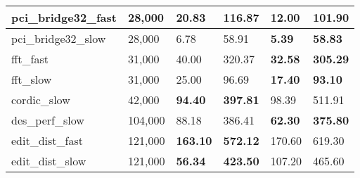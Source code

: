 \begin{table*}[!ht]
\begin{tabular}{|l|l|l|l|l|l|}
pci\_bridge32\_fast        & 28,000                 & 20.83                                                        & 116.87                                                         & \textbf{12.00}                                               & \textbf{101.90}                                                 \\ \hline
pci\_bridge32\_slow        & 28,000                 & 6.78                                                         & 58.91                                                          & \textbf{5.39}                                                & \textbf{58.83}                                                  \\ \hline
fft\_fast                  & 31,000                 & 40.00                                                        & 320.37                                                         & \textbf{32.58}                                               & \textbf{305.29}                                                 \\ \hline
fft\_slow                  & 31,000                 & 25.00                                                        & 96.69                                                          & \textbf{17.40}                                               & \textbf{93.10}                                                  \\ \hline
cordic\_slow               & 42,000                 & \textbf{94.40}                                               & \textbf{397.81}                                                & 98.39                                                        & 511.91                                                          \\ \hline
des\_perf\_slow            & 104,000                & 88.18                                                        & 386.41                                                         & \textbf{62.30}                                               & \textbf{375.80}                                                 \\ \hline
edit\_dist\_fast           & 121,000                & \textbf{163.10}                                              & \textbf{572.12}                                                & 170.60                                                       & 619.30                                                          \\ \hline
edit\_dist\_slow           & 121,000                & \textbf{56.34}                                               & \textbf{423.50}                                                & 107.20                                                       & 465.60                                                          \\ \hline

\end{tabular}
\end{table*}
